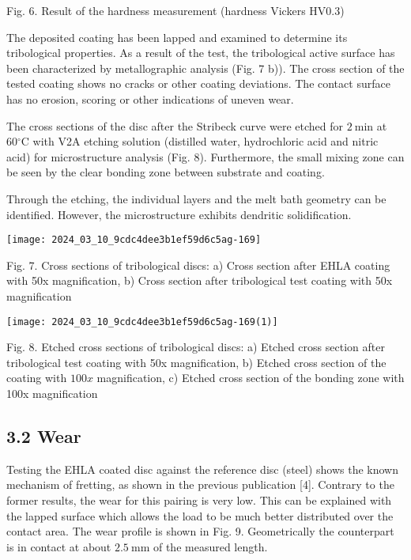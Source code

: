 \documentclass[10pt]{article}
\begin{document}
Fig. 6. Result of the hardness measurement (hardness Vickers HV0.3)

The deposited coating has been lapped and examined to determine its tribological properties. As a result of the test, the tribological active surface has been characterized by metallographic analysis (Fig. 7 b)). The cross section of the tested coating shows no cracks or other coating deviations. The contact surface has no erosion, scoring or other indications of uneven wear.

The cross sections of the disc after the Stribeck curve were etched for $2 \mathrm{~min}$ at $60{ }^{\circ} \mathrm{C}$ with V2A etching solution (distilled water, hydrochloric acid and nitric acid) for microstructure analysis (Fig. 8). Furthermore, the small mixing zone can be seen by the clear bonding zone between substrate and coating.

Through the etching, the individual layers and the melt bath geometry can be identified. However, the microstructure exhibits dendritic solidification.

\begin{center}
\texttt{[image: 2024\_03\_10\_9cdc4dee3b1ef59d6c5ag-169]}
\end{center}

Fig. 7. Cross sections of tribological discs: a) Cross section after EHLA coating with 50x magnification, b) Cross section after tribological test coating with 50x magnification

\begin{center}
\texttt{[image: 2024\_03\_10\_9cdc4dee3b1ef59d6c5ag-169(1)]}
\end{center}

Fig. 8. Etched cross sections of tribological discs: a) Etched cross section after tribological test coating with 50x magnification, b) Etched cross section of the coating with $100 x$ magnification, c) Etched cross section of the bonding zone with 100x magnification

\subsection*{3.2 Wear}
Testing the EHLA coated disc against the reference disc (steel) shows the known mechanism of fretting, as shown in the previous publication [4]. Contrary to the former results, the wear for this pairing is very low. This can be explained with the lapped surface which allows the load to be much better distributed over the contact area. The wear profile is shown in Fig. 9. Geometrically the counterpart is in contact at about $2.5 \mathrm{~mm}$ of the measured length.
\end{document}
